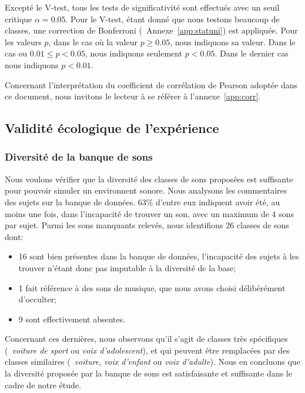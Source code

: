 Excepté le V-test, tous les tests de significativité sont effectués avec un seuil critique $\alpha=0.05$. Pour le V-test, étant donné que nous testons beaucoup de classes, une correction de Bonferroni (\cf~Annexe~\ref{app:statuni}) est appliquée. Pour les valeurs $p$, dans le cas où la valeur $p\geq0.05$, nous indiquons sa valeur. Dans le cas ou $0.01\leq p<0.05$, nous indiquons seulement $p<0.05$. Dans le dernier cas nous indiquons $p<0.01$.

Concernant l'interprétation du coefficient de corrélation de Pearson adoptée dans ce document, nous invitons le lecteur à se référer à l'annexe~\ref{app:corr}.

\subsection{Validité écologique de l'expérience}

\subsubsection{Diversité de la banque de sons}

Nous voulons vérifier que la diversité des classes de sons proposées est suffisante pour pouvoir simuler un environnent sonore. Nous analysons les commentaires des sujets sur la banque de données. 63\% d'entre eux indiquent avoir été, au moins une fois, dans l'incapacité de trouver un son, avec un maximum de 4 sons par sujet. Parmi les sons manquants relevés, nous identifions 26 classes de sons dont:

\begin{itemize}
\item 16 sont bien présentes dans la banque de données, l'incapacité des sujets à les trouver n'étant donc pas imputable à la diversité de la base;
\item 1 fait référence à des sons de musique, que nous avons choisi délibérément d'occulter;
\item 9 sont effectivement absentes.  
\end{itemize}

Concernant ces dernières, nous observons qu'il s'agit de classes très spécifiques (\eg~\emph{voiture de sport} ou \emph{voix d'adolescent}), et qui peuvent être remplacées par des classes similaires (\eg~\emph{voiture}, \emph{voix d'enfant} ou \emph{voix d'adulte}). Nous en concluons que la diversité proposée par la banque de sons est satisfaisante et suffisante dans le cadre de notre étude.

